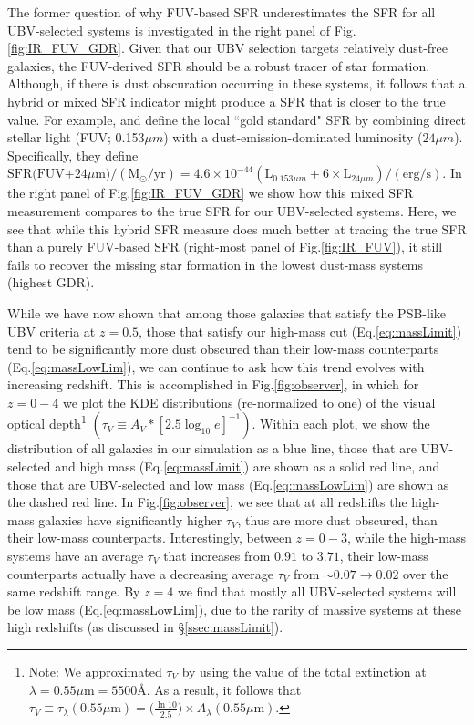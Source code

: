 \documentclass[twocolumn, linenumbers]{aastex631}
\newcommand{\eq}{Eq.\hspace{.2em}}
\renewcommand{\fig}{Fig.\hspace{.2em}}
\begin{document}
The former question of why FUV-based SFR underestimates the SFR for all UBV-selected systems is investigated in the right panel of \fig \ref{fig:IR_FUV_GDR}.  Given that our UBV selection targets relatively dust-free galaxies, the FUV-derived SFR should be a robust tracer of star formation.  Although, if there is dust obscuration occurring in these systems, it follows that a hybrid or mixed SFR indicator might produce a SFR that is closer to the true value.  For example, \cite{Calzetti07} and \cite{Hao11} define the local ``gold standard" SFR by combining direct stellar light (FUV; 0.153$\mu m$) with a dust-emission-dominated luminosity ($24\mu m$).  Specifically, they define $\text{SFR(FUV+24}\mu \text{m)}/(\text{M}_\odot/\text{yr})=4.6\times 10^{-44}\left(\text{L}_{0.153\mu m}+6 \times \text{L}_{24\mu m}\right)/(\text{erg/s})$.  In the right panel of \fig \ref{fig:IR_FUV_GDR} we show how this mixed SFR measurement compares to the true SFR for our UBV-selected systems.  Here, we see that while this hybrid SFR measure does much better at tracing the true SFR than a purely FUV-based SFR (right-most panel of \fig \ref{fig:IR_FUV}), it still fails to recover the missing star formation in the lowest dust-mass systems (highest GDR).

While we have now shown that among those galaxies that satisfy the PSB-like UBV criteria at $z=0.5$, those that satisfy our high-mass cut (\eq \ref{eq:massLimit}) tend to be significantly more dust obscured than their low-mass counterparts (\eq \ref{eq:massLowLim}), we can continue to ask how this trend evolves with increasing redshift.  This is accomplished in \fig \ref{fig:observer}, in which for $z=0-4$ we plot the KDE distributions (re-normalized to one) of the visual optical depth\footnote{Note: We approximated $\tau_V$ by using the value of the total extinction at $\lambda=0.55\mu\text{m}=5500$\r{A}.  As a result, it follows that $\tau_V\equiv \tau_\lambda(0.55\mu\text{m})=\big(\frac{\ln{10}}{2.5}\big)\times A_\lambda(0.55\mu\text{m})$.} $(\tau_V\equiv A_V*[2.5\log_{10}\!{e}]^{-1})$.  Within each plot, we show the distribution of all galaxies in our simulation as a blue line, those that are UBV-selected and high mass (\eq \ref{eq:massLimit}) are shown as a solid red line, and those that are UBV-selected and low mass (\eq \ref{eq:massLowLim}) are shown as the dashed red line.  In \fig \ref{fig:observer}, we see that at all redshifts the high-mass galaxies have significantly higher $\tau_V$, thus are more dust obscured, than their low-mass counterparts.  Interestingly, between $z=0-3$, while the high-mass systems have an average $\tau_V$ that increases from $0.91$ to $3.71$, their low-mass counterparts actually have a decreasing average $\tau_V$ from $\sim 0.07\to 0.02$ over the same redshift range.  By $z=4$ we find that mostly all UBV-selected systems will be low mass (\eq \ref{eq:massLowLim}), due to the rarity of massive systems at these high redshifts (as discussed in \S\ref{ssec:massLimit}).
\end{document}

